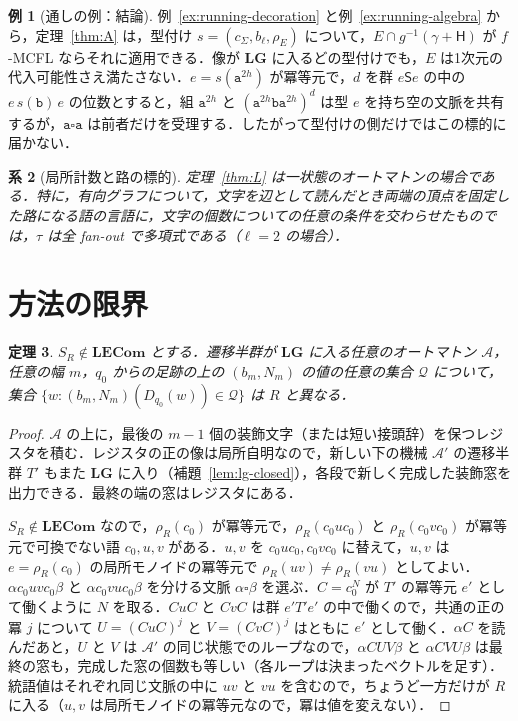 \documentclass[11pt,a4paper]{ltjsarticle}
\numberwithin{equation}{section}
\theoremstyle{plain}
\newtheorem{theorem}{定理}[section]
\newtheorem{corollary}[theorem]{系}
\theoremstyle{definition}
\newtheorem{example}[theorem]{例}
\theoremstyle{remark}
\theoremstyle{plain}
\newcommand{\blank}{\square}
\newcommand{\LG}{\mathbf{LG}}
\newcommand{\LECom}{\mathbf{L}\mathbf{ECom}}
\begin{document}
\begin{example}[通しの例：結論]
\label{ex:even-runs}
例~\ref{ex:running-decoration} と例~\ref{ex:running-algebra} から，定理~\ref{thm:A} は，型付け $s=(c_\Sigma,b_\ell,\rho_E)$ について，$E\cap g^{-1}(\gamma+\mathsf H)$ が $f$-MCFL ならそれに適用できる．像が $\LG$ に入るどの型付けでも，$E$ は1次元の代入可能性さえ満たさない．$e=s(\mathtt a^{2h})$ が冪等元で，$d$ を群 $e\mathsf Se$ の中の $e\,s(\mathtt b)\,e$ の位数とすると，組 $\mathtt a^{2h}$ と $(\mathtt a^{2h}\mathtt b\mathtt a^{2h})^d$ は型 $e$ を持ち空の文脈を共有するが，$\mathtt a\blank\mathtt a$ は前者だけを受理する．したがって型付けの側だけではこの標的に届かない．
\end{example}

\begin{corollary}[局所計数と路の標的]
\label{cor:local}
定理~\ref{thm:L} は一状態のオートマトンの場合である．特に，有向グラフについて，文字を辺として読んだとき両端の頂点を固定した路になる語の言語に，文字の個数についての任意の条件を交わらせたものでは，$\tau$ は全 fan-out で多項式である（$\ell=2$ の場合）．
\end{corollary}

\section{方法の限界}
\label{sec:limits}

\begin{theorem}
\label{thm:limits}
$S_R\notin\LECom$ とする．遷移半群が $\LG$ に入る任意のオートマトン $\mathcal A$，任意の幅 $m$，$q_0$ からの足跡の上の $(b_m,N_m)$ の値の任意の集合 $\mathcal Q$ について，集合 $\{w:(b_m,N_m)(D_{q_0}(w))\in\mathcal Q\}$ は $R$ と異なる．
\end{theorem}

\begin{proof}
$\mathcal A$ の上に，最後の $m-1$ 個の装飾文字（または短い接頭辞）を保つレジスタを積む．レジスタの正の像は局所自明なので，新しい下の機械 $\mathcal A'$ の遷移半群 $T'$ もまた $\LG$ に入り（補題~\ref{lem:lg-closed}），各段で新しく完成した装飾窓を出力できる．最終の端の窓はレジスタにある．

$S_R\notin\LECom$ なので，$\rho_R(c_0)$ が冪等元で，$\rho_R(c_0uc_0)$ と $\rho_R(c_0vc_0)$ が冪等元で可換でない語 $c_0,u,v$ がある．$u,v$ を $c_0uc_0,c_0vc_0$ に替えて，$u,v$ は $e=\rho_R(c_0)$ の局所モノイドの冪等元で $\rho_R(uv)\ne\rho_R(vu)$ としてよい．$\alpha c_0uvc_0\beta$ と $\alpha c_0vuc_0\beta$ を分ける文脈 $\alpha\blank\beta$ を選ぶ．$C=c_0^N$ が $T'$ の冪等元 $e'$ として働くように $N$ を取る．$CuC$ と $CvC$ は群 $e'T'e'$ の中で働くので，共通の正の冪 $j$ について $U=(CuC)^j$ と $V=(CvC)^j$ はともに $e'$ として働く．$\alpha C$ を読んだあと，$U$ と $V$ は $\mathcal A'$ の同じ状態でのループなので，$\alpha CUV\beta$ と $\alpha CVU\beta$ は最終の窓も，完成した窓の個数も等しい（各ループは決まったベクトルを足す）．統語値はそれぞれ同じ文脈の中に $uv$ と $vu$ を含むので，ちょうど一方だけが $R$ に入る（$u,v$ は局所モノイドの冪等元なので，冪は値を変えない）．
\end{proof}
\end{document}
